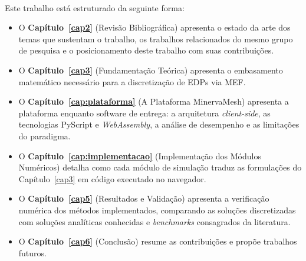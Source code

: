 \paragraph{}Este trabalho está estruturado da seguinte forma:
\begin{itemize}
    \item O \textbf{Capítulo~\ref{cap2}} (Revisão Bibliográfica) apresenta o estado da arte dos temas que sustentam o trabalho, os trabalhos relacionados do mesmo grupo de pesquisa e o posicionamento deste trabalho com suas contribuições.
    \item O \textbf{Capítulo~\ref{cap3}} (Fundamentação Teórica) apresenta o embasamento matemático necessário para a discretização de EDPs via MEF.
    \item O \textbf{Capítulo~\ref{cap:plataforma}} (A Plataforma MinervaMesh) apresenta a plataforma enquanto software de entrega: a arquitetura \textit{client-side}, as tecnologias PyScript e \textit{WebAssembly}, a análise de desempenho e as limitações do paradigma.
    \item O \textbf{Capítulo~\ref{cap:implementacao}} (Implementação dos Módulos Numéricos) detalha como cada módulo de simulação traduz as formulações do Capítulo~\ref{cap3} em código executado no navegador.
    \item O \textbf{Capítulo~\ref{cap5}} (Resultados e Validação) apresenta a verificação numérica dos métodos implementados, comparando as soluções discretizadas com soluções analíticas conhecidas e \textit{benchmarks} consagrados da literatura.
    \item O \textbf{Capítulo~\ref{cap6}} (Conclusão) resume as contribuições e propõe trabalhos futuros.
\end{itemize}
